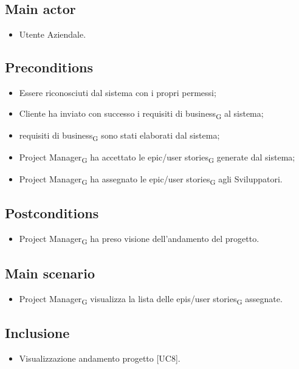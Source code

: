 \documentclass{article}
\begin{document}
    \subsection*{Main actor}
        \begin{itemize}
            \item Utente Aziendale.
        \end{itemize}
        
    \subsection*{Preconditions}
        \begin{itemize}
            \item Essere riconosciuti dal sistema con i propri permessi;
            \item Cliente ha inviato con successo i requisiti di business\textsubscript{G} al sistema;
            \item requisiti di business\textsubscript{G} sono stati elaborati dal sistema;
            \item Project Manager\textsubscript{G} ha accettato le epic/user stories\textsubscript{G} generate dal sistema;
            \item Project Manager\textsubscript{G} ha assegnato le epic/user stories\textsubscript{G} agli Sviluppatori.
        \end{itemize}
        
    \subsection*{Postconditions}
    \begin{itemize}
        \item Project Manager\textsubscript{G} ha preso visione dell'andamento del progetto.
    \end{itemize}
    
    \subsection*{Main scenario}
        \begin{itemize}
            \item Project Manager\textsubscript{G} visualizza la lista delle epis/user stories\textsubscript{G} assegnate.
        \end{itemize}
        
    \subsection*{Inclusione}
        \begin{itemize}
            \item Visualizzazione andamento progetto [UC8].
        \end{itemize}
\end{document}
